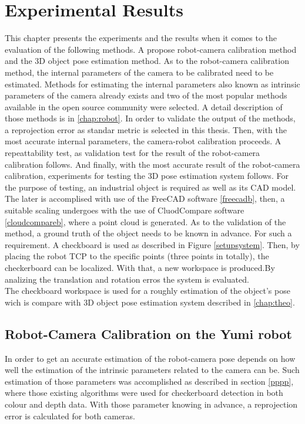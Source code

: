 
\chapter{Experimental Results}
\label{chap:exp}

This chapter presents the experiments and the results when it comes to the evaluation of the following methods. A propose robot-camera calibration method and the 3D object pose estimation method. As to the robot-camera calibration method, the internal parameters of the camera to be calibrated need to be estimated. Methods for estimating the internal parameters also known as intrinsic parameters of the camera already exists and two of the most popular methods available in the open source community were selected. A detail description of those methods is in \ref{chap:robot}. In order to validate the output of the methods, a reprojection error as standar metric is selected in this thesis. Then, with the most accurate internal parameters, the camera-robot calibration proceeds. A repeattability test, as validation test for the result of the robot-camera calibration  follows. And finally, with the most accurate result of the robot-camera calibration, experiments for testing the 3D pose estimation system follows. For the purpose of testing, an industrial object is required as well as its CAD model. The later is accomplised with use of the FreeCAD software \ref{freecadb}, then, a suitable scaling undergoes with the use of CluodCompare software \ref{cloudcompareb}, where a point cloud is generated. As to the validation of the method, a ground truth of the object needs to be known in advance. For such a requirement. A checkboard is used as described in Figure \ref{setupsystem}. Then, by placing the robot TCP to the specific points (three points in totally), the checkerboard can be localized. With that, a new workspace is produced.By analizing the translation and rotation erros the system is evaluated.\\
The checkboard workspace is used for a roughly estimation of the object's pose wich is compare with 3D object pose estimation system described in \ref{chap:theo}.  


\section{Robot-Camera Calibration on the Yumi robot}
In order to get an accurate estimation of the robot-camera pose depends on how well the estimation of the intrinsic parameters related to the camera can be. Such estimation of those parameters was accomplished as described in section \ref{pppp}, where those existing algorithms were used for checkerboard detection in both colour and depth data. With those parameter knowing in advance, a reprojection error is calculated for both cameras. 

